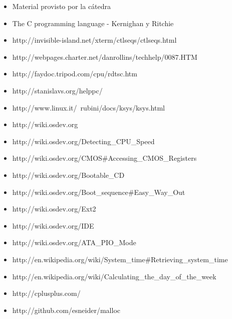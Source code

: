 \documentclass[a4paper,10pt]{article}
\begin{document}
\begin{itemize}
  \item Material provisto por la cátedra
  \item The C programming language - Kernighan y Ritchie
  \item http://invisible-island.net/xterm/ctlseqs/ctlseqs.html
  \item http://webpages.charter.net/danrollins/techhelp/0087.HTM
  \item http://faydoc.tripod.com/cpu/rdtsc.htm
  \item http://stanislavs.org/helppc/
  \item http://www.linux.it/~rubini/docs/ksys/ksys.html
  \item http://wiki.osdev.org
  \item http://wiki.osdev.org/Detecting\_CPU\_Speed
  \item	http://wiki.osdev.org/CMOS\#Accessing\_CMOS\_Registers
  \item http://wiki.osdev.org/Bootable\_CD
  \item http://wiki.osdev.org/Boot\_sequence\#Easy\_Way\_Out
  \item http://wiki.osdev.org/Ext2
  \item http://wiki.osdev.org/IDE
  \item http://wiki.osdev.org/ATA\_PIO\_Mode
  \item http://en.wikipedia.org/wiki/System\_time\#Retrieving\_system\_time
  \item http://en.wikipedia.org/wiki/Calculating\_the\_day\_of\_the\_week
  \item http://cplusplus.com/
  \item http://github.com/esneider/malloc
\end{itemize}
   
\end{document}

